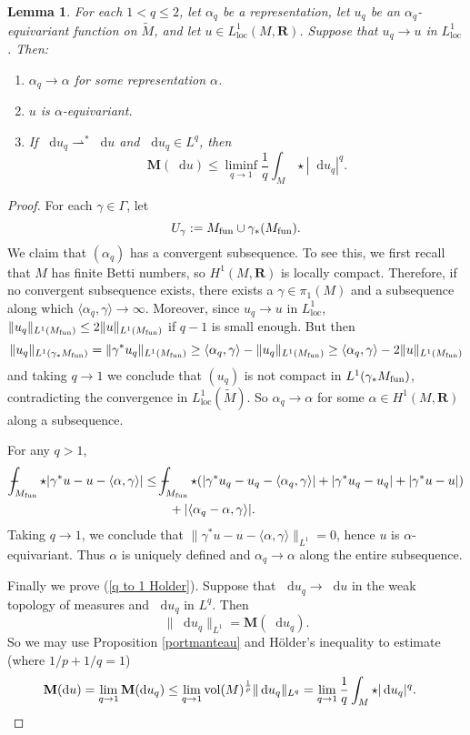 \documentclass[reqno,11pt]{amsart}
\newcommand{\RR}{\mathbf{R}}
\newcommand*\dif{\mathop{}\!\mathrm{d}}
\newcommand{\weakto}{\rightharpoonup}
\newcommand{\vol}{\mathrm{vol}}
\newcommand{\Mass}{\mathbf M}
\newcommand{\loc}{\mathrm{loc}}
\newtheorem{lemma}[theorem]{Lemma}
\theoremstyle{definition}
\numberwithin{equation}{section}
\def\Xint#1{\mathchoice
{\XXint\displaystyle\textstyle{#1}}%
{\XXint\textstyle\scriptstyle{#1}}%
{\XXint\scriptstyle\scriptscriptstyle{#1}}%
{\XXint\scriptscriptstyle\scriptscriptstyle{#1}}%
\!\int}
\def\XXint#1#2#3{{\setbox0=\hbox{$#1{#2#3}{\int}$ }
\vcenter{\hbox{$#2#3$ }}\kern-.6\wd0}}
\def\dashint{\Xint-}
\begin{document}
\begin{lemma}\label{L1 convergence preserves pi1}
For each $1 < q \leq 2$, let $\alpha_q$ be a representation, let $u_q$ be an $\alpha_q$-equivariant function on $\tilde M$, and let $u \in L^1_\loc(M, \RR)$.
Suppose that $u_q \to u$ in $L^1_\loc$.
Then:
\begin{enumerate}
\item $\alpha_q \to \alpha$ for some representation $\alpha$.
\item $u$ is $\alpha$-equivariant.
\item If $\dif u_q \weakto^* \dif u$ and $\dif u_q \in L^q$, then
\begin{equation}\label{q to 1 Holder}
\Mass(\dif u) \leq \liminf_{q \to 1} \frac{1}{q} \int_M \star |\dif u_q|^q.
\end{equation}
\end{enumerate}
\end{lemma}
\begin{proof}
For each $\gamma \in \Gamma$, let
$$U_\gamma := M_{\rm fun} \cup \gamma_* (M_{\rm fun}).$$
We claim that $(\alpha_q)$ has a convergent subsequence.
To see this, we first recall that $M$ has finite Betti numbers, so $H^1(M, \RR)$ is locally compact.
Therefore, if no convergent subsequence exists, there exists a $\gamma \in \pi_1(M)$ and a subsequence along which $\langle \alpha_q, \gamma\rangle \to \infty$.
Moreover, since $u_q \to u$ in $L^1_\loc$, $\|u_q\|_{L^1(M_{\rm fun})} \leq 2\|u\|_{L^1(M_{\rm fun})}$ if $q - 1$ is small enough.
But then 
$$\|u_q\|_{L^1(\gamma_* M_{\rm fun})} = \|\gamma^* u_q\|_{L^1(M_{\rm fun})} \geq \langle \alpha_q, \gamma\rangle - \|u_q\|_{L^1(M_{\rm fun})} \geq \langle \alpha_q, \gamma\rangle - 2\|u\|_{L^1(M_{\rm fun})}$$
and taking $q \to 1$ we conclude that $(u_q)$ is not compact in $L^1(\gamma_* M_{\rm fun})$, contradicting the convergence in $L^1_\loc(\tilde M)$.
So $\alpha_q \to \alpha$ for some $\alpha \in H^1(M, \RR)$ along a subsequence.

For any $q > 1$,
\begin{align*}
\dashint_{M_{\rm fun}} \star |\gamma^* u - u - \langle \alpha, \gamma\rangle| 
&\leq \dashint_{M_{\rm fun}} \star (|\gamma^* u_q - u_q - \langle \alpha_q, \gamma\rangle| + |\gamma^* u_q - u_q| + |\gamma^* u - u|) \\
&\qquad + |\langle \alpha_q - \alpha, \gamma\rangle|.
\end{align*}
Taking $q \to 1$, we conclude that $\|\gamma^* u - u - \langle \alpha, \gamma\rangle\|_{L^1} = 0$, hence $u$ is $\alpha$-equivariant.
Thus $\alpha$ is uniquely defined and $\alpha_q \to \alpha$ along the entire subsequence.

Finally we prove (\ref{q to 1 Holder}).
Suppose that $\dif u_q \to \dif u$ in the weak topology of measures and $\dif u_q$ in $L^q$.
Then
$$\|\dif u_q\|_{L^1} = \Mass(\dif u_q).$$
So we may use Proposition \ref{portmanteau} and H\"older's inequality to estimate (where $1/p + 1/q = 1$)
\begin{align*}
\Mass(\dif u) &= \lim_{q \to 1} \Mass(\dif u_q) \leq \lim_{q \to 1} \vol(M)^{\frac{1}{p}} \|\dif u_q\|_{L^q} = \lim_{q \to 1} \frac{1}{q} \int_M \star |\dif u_q|^q. \qedhere
\end{align*}
\end{proof}
\end{document}
